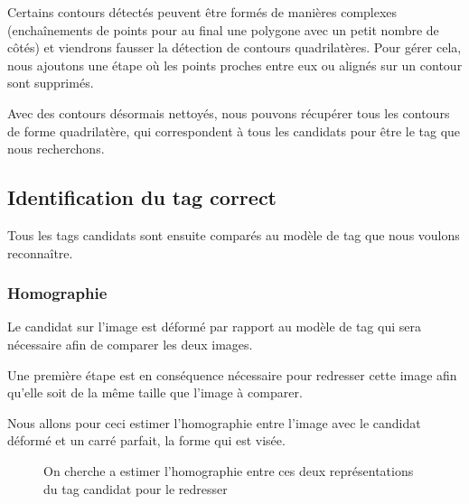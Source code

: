         Certains contours détectés peuvent être formés de manières complexes (enchaînements de points pour au final une polygone avec un petit nombre de côtés) et viendrons fausser la détection de contours quadrilatères. Pour gérer cela, nous ajoutons une étape où les points proches entre eux ou alignés sur un contour sont supprimés.

        Avec des contours désormais nettoyés, nous pouvons récupérer tous les contours de forme quadrilatère, qui correspondent à tous les candidats pour être le tag que nous recherchons.

        \subsection{Identification du tag correct}

        Tous les tags candidats sont ensuite comparés au modèle de tag que nous voulons reconnaître.

        \subsubsection{Homographie}

        Le candidat sur l'image est déformé par rapport au modèle de tag qui sera nécessaire afin de comparer les deux images.

        Une première étape est en conséquence nécessaire pour redresser cette image afin qu'elle soit de la même taille que l'image à comparer.

        Nous allons pour ceci estimer l'homographie entre l'image avec le candidat déformé et un carré parfait, la forme qui est visée.

        \begin{figure}[h]
            \centering
            \hspace{.02\textwidth}
            \caption{On cherche a estimer l'homographie entre ces deux représentations du tag candidat pour le redresser}
        \end{figure}

